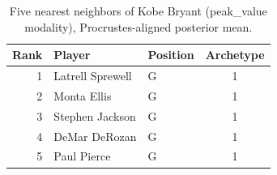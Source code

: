 \begin{table}[htbp]
  \centering\small
  \begin{tabular}{rllc}
    \toprule
    Rank & Player & Position & Archetype \\
    \midrule
    1 & Latrell Sprewell & G & 1 \\
    2 & Monta Ellis & G & 1 \\
    3 & Stephen Jackson & G & 1 \\
    4 & DeMar DeRozan & G & 1 \\
    5 & Paul Pierce & G & 1 \\
    \bottomrule
  \end{tabular}
  \caption{Five nearest neighbors of Kobe Bryant (peak_value modality), Procrustes-aligned posterior mean.}
  \label{tab:Kobe_Bryant_neighbors_peak_value}
\end{table}

